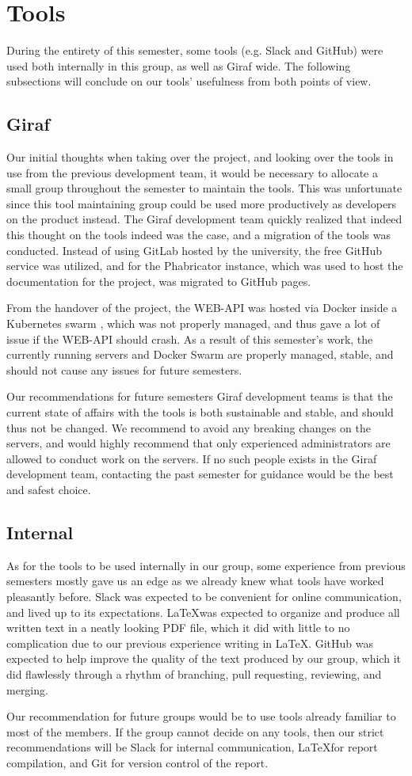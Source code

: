 \section{Tools}
During the entirety of this semester, some tools (e.g. Slack and GitHub) were used both internally in this group, as well as Giraf wide.
The following subsections will conclude on our tools' usefulness from both points of view.

\subsection{Giraf}
Our initial thoughts when taking over the project, and looking over the tools in use from the previous development team, it would be necessary to allocate a small group throughout the semester to maintain the tools.
This was unfortunate since this tool maintaining group could be used more productively as developers on the product instead.
The Giraf development team quickly realized that indeed this thought on the tools indeed was the case, and a migration of the tools was conducted.
Instead of using GitLab hosted by the university, the free GitHub service was utilized, and for the Phabricator instance, which was used to host the documentation for the project, was migrated to GitHub pages.

From the handover of the project, the WEB-API was hosted via Docker inside a Kubernetes swarm , which was not properly managed, and thus gave a lot of issue if the WEB-API should crash.
As a result of this semester's work, the currently running servers and Docker Swarm are properly managed, stable, and should not cause any issues for future semesters.

Our recommendations for future semesters Giraf development teams is that the current state of affairs with the tools is both sustainable and stable, and should thus not be changed.
We recommend to avoid any breaking changes on the servers, and would highly recommend that only experienced administrators are allowed to conduct work on the servers.
If no such people exists in the Giraf development team, contacting the past semester for guidance would be the best and safest choice.

\subsection{Internal}
As for the tools to be used internally in our group, some experience from previous semesters mostly gave us an edge as we already knew what tools have worked pleasantly before.
Slack was expected to be convenient for online communication, and lived up to its expectations.
\LaTeX was expected to organize and produce all written text in a neatly looking PDF file, which it did with little to no complication due to our previous experience writing in \LaTeX.
GitHub was expected to help improve the quality of the text produced by our group, which it did flawlessly through a rhythm of branching, pull requesting, reviewing, and merging.

Our recommendation for future groups would be to use tools already familiar to most of the members.
If the group cannot decide on any tools, then our strict recommendations will be Slack for internal communication, \LaTeX for report compilation, and Git for version control of the report.
